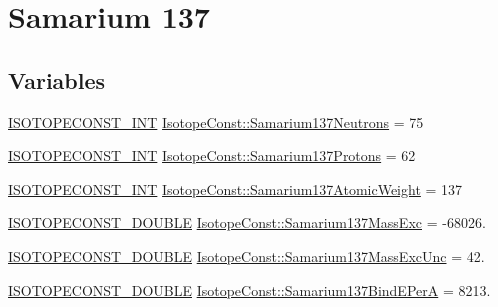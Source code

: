 \hypertarget{group___isotope_const-_samarium-_sm137}{}\section{Samarium 137}
\label{group___isotope_const-_samarium-_sm137}
\subsection*{Variables}
\begin{DoxyCompactItemize}
\item 
\mbox{\hyperlink{group___isotope_const-_macros_ga5f18360b3e99483a35c32d789e62621c}{I\+S\+O\+T\+O\+P\+E\+C\+O\+N\+S\+T\+\_\+\+I\+NT}} \mbox{\hyperlink{group___isotope_const-_samarium-_sm137_ga978cc3fc0595f3bb310b2b6665e14e20}{Isotope\+Const\+::\+Samarium137\+Neutrons}} = 75
\item 
\mbox{\hyperlink{group___isotope_const-_macros_ga5f18360b3e99483a35c32d789e62621c}{I\+S\+O\+T\+O\+P\+E\+C\+O\+N\+S\+T\+\_\+\+I\+NT}} \mbox{\hyperlink{group___isotope_const-_samarium-_sm137_ga8b553873ebb3d4ea080cf3ed547669a7}{Isotope\+Const\+::\+Samarium137\+Protons}} = 62
\item 
\mbox{\hyperlink{group___isotope_const-_macros_ga5f18360b3e99483a35c32d789e62621c}{I\+S\+O\+T\+O\+P\+E\+C\+O\+N\+S\+T\+\_\+\+I\+NT}} \mbox{\hyperlink{group___isotope_const-_samarium-_sm137_gaec65bdbe4187ae6fd16619bd1eab37a4}{Isotope\+Const\+::\+Samarium137\+Atomic\+Weight}} = 137
\item 
\mbox{\hyperlink{group___isotope_const-_macros_ga8f45a7272ce02c0b4c65c44636ed719a}{I\+S\+O\+T\+O\+P\+E\+C\+O\+N\+S\+T\+\_\+\+D\+O\+U\+B\+LE}} \mbox{\hyperlink{group___isotope_const-_samarium-_sm137_gab5e0c97b8f53881e1b8244021bccb83c}{Isotope\+Const\+::\+Samarium137\+Mass\+Exc}} = -\/68026.
\item 
\mbox{\hyperlink{group___isotope_const-_macros_ga8f45a7272ce02c0b4c65c44636ed719a}{I\+S\+O\+T\+O\+P\+E\+C\+O\+N\+S\+T\+\_\+\+D\+O\+U\+B\+LE}} \mbox{\hyperlink{group___isotope_const-_samarium-_sm137_ga0bed463726ac9f4bbfcf89e27f4b64ba}{Isotope\+Const\+::\+Samarium137\+Mass\+Exc\+Unc}} = 42.
\item 
\mbox{\hyperlink{group___isotope_const-_macros_ga8f45a7272ce02c0b4c65c44636ed719a}{I\+S\+O\+T\+O\+P\+E\+C\+O\+N\+S\+T\+\_\+\+D\+O\+U\+B\+LE}} \mbox{\hyperlink{group___isotope_const-_samarium-_sm137_ga587d49da46a1a8cc93c510841b0c3963}{Isotope\+Const\+::\+Samarium137\+Bind\+E\+PerA}} = 8213.
\item 

\end{DoxyCompactItemize}

